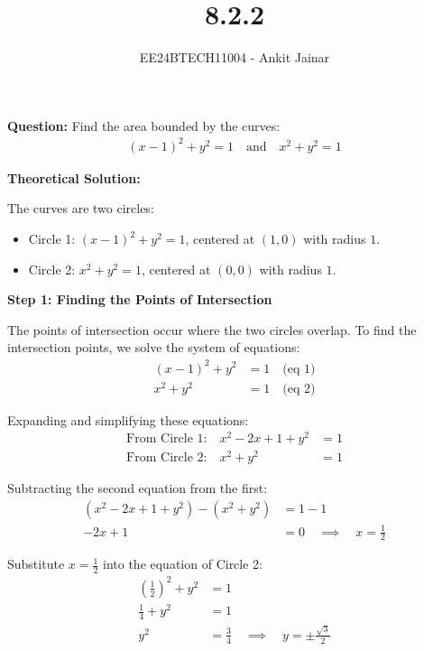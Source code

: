 \documentclass[journal]{IEEEtran}
\title{8.2.2}
\author{EE24BTECH11004 - Ankit Jainar}
\date{}
\begin{document}

\vspace{3cm}

\maketitle

\bigskip

\textbf{Question:}
Find the area bounded by the curves:
\begin{align}
    (x - 1)^2 + y^2 = 1 \quad \text{and} \quad x^2 + y^2 = 1
\end{align}
\newline

\textbf{Theoretical Solution:}

The curves are two circles:
\begin{itemize}
    \item Circle 1: $(x - 1)^2 + y^2 = 1$, centered at $(1, 0)$ with radius $1$.
    \item Circle 2: $x^2 + y^2 = 1$, centered at $(0, 0)$ with radius $1$.
\end{itemize}

\textbf{Step 1: Finding the Points of Intersection}

The points of intersection occur where the two circles overlap. To find the intersection points, we solve the system of equations:
\begin{align}
    (x - 1)^2 + y^2 &= 1 \quad \text{(eq 1)} \\
    x^2 + y^2 &= 1 \quad \text{(eq 2)}
\end{align}

Expanding and simplifying these equations:
\begin{align}
    \text{From Circle 1:} \quad x^2 - 2x + 1 + y^2 &= 1 \\
    \text{From Circle 2:} \quad x^2 + y^2 &= 1
\end{align}

Subtracting the second equation from the first:
\begin{align}
    (x^2 - 2x + 1 + y^2) - (x^2 + y^2) &= 1 - 1 \\
    -2x + 1 &= 0 \quad \implies \quad x = \frac{1}{2}
\end{align}

Substitute $x = \frac{1}{2}$ into the equation of Circle 2:
\begin{align}
    \left(\frac{1}{2}\right)^2 + y^2 &= 1 \\
    \frac{1}{4} + y^2 &= 1 \\
    y^2 &= \frac{3}{4} \quad \implies \quad y = \pm \frac{\sqrt{3}}{2}
\end{align}
\end{document}
